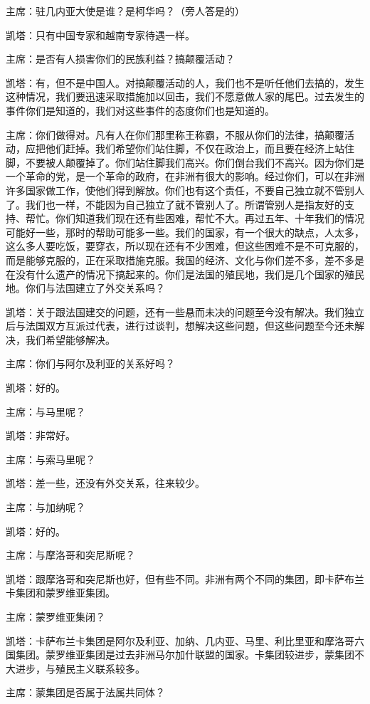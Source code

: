 主席：驻几内亚大使是谁？是柯华吗？（旁人答是的）

凯塔：只有中国专家和越南专家待遇一样。

主席：是否有人损害你们的民族利益？搞颠覆活动？

凯塔：有，但不是中国人。对搞颠覆活动的人，我们也不是听任他们去搞的，发生这种情况，我们要迅速采取措施加以回击，我们不愿意做人家的尾巴。过去发生的事件你们是知道的，我们对这些事件的态度你们也是知道的。

主席：你们做得对。凡有人在你们那里称王称霸，不服从你们的法律，搞颠覆活动，应把他们赶掉。我们希望你们站住脚，不仅在政治上，而且要在经济上站住脚，不要被人颠覆掉了。你们站住脚我们高兴。你们倒台我们不高兴。因为你们是一个革命的党，是一个革命的政府，在非洲有很大的影响。经过你们，可以在非洲许多国家做工作，使他们得到解放。你们也有这个责任，不要自己独立就不管别人了。我们也一样，不能因为自己独立了就不管别人了。所谓管别人是指友好的支持、帮忙。你们知道我们现在还有些困难，帮忙不大。再过五年、十年我们的情况可能好一些，那时的帮助可能多一些。我们的国家，有一个很大的缺点，人太多，这么多人要吃饭，要穿衣，所以现在还有不少困难，但这些困难不是不可克服的，而是能够克服的，正在采取措施克服。我国的经济、文化与你们差不多，差不多是在没有什么遗产的情况下搞起来的。你们是法国的殖民地，我们是几个国家的殖民地。你们与法国建立了外交关系吗？

凯塔：关于跟法国建交的问题，还有一些悬而未决的问题至今没有解决。我们独立后与法国双方互派过代表，进行过谈判，想解决这些问题，但这些问题至今还未解决，我们希望能够解决。

主席：你们与阿尔及利亚的关系好吗？

凯塔：好的。

主席：与马里呢？

凯塔：非常好。

主席：与索马里呢？

凯塔：差一些，还没有外交关系，往来较少。

主席：与加纳呢？

凯塔：好的。

主席：与摩洛哥和突尼斯呢？

凯塔：跟摩洛哥和突尼斯也好，但有些不同。非洲有两个不同的集团，即卡萨布兰卡集团和蒙罗维亚集团。

主席：蒙罗维亚集闭？

凯塔：卡萨布兰卡集团是阿尔及利亚、加纳、几内亚、马里、利比里亚和摩洛哥六国集团。蒙罗维亚集团是过去非洲马尔加什联盟的国家。卡集团较进步，蒙集团不大进步，与殖民主义联系较多。

主席：蒙集团是否属于法属共同体？

